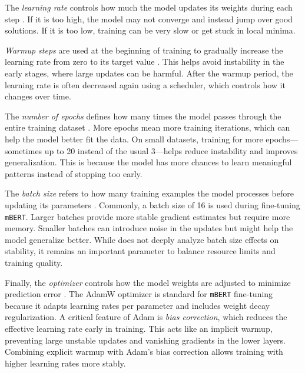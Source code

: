     The \textit{learning rate} controls how much the model updates its weights during each step \parencite{mosbachStabilityFinetuningBERT2021}. If it is too high, the model may not converge and instead jump over good solutions. If it is too low, training can be very slow or get stuck in local minima.

    \textit{Warmup steps} are used at the beginning of training to gradually increase the learning rate from zero to its target value \parencite{mosbachStabilityFinetuningBERT2021}. This helps avoid instability in the early stages, where large updates can be harmful. After the warmup period, the learning rate is often decreased again using a scheduler, which controls how it changes over time.

    The \textit{number of epochs} defines how many times the model passes through the entire training dataset \parencite{mosbachStabilityFinetuningBERT2021}. More epochs mean more training iterations, which can help the model better fit the data. On small datasets, training for more epochs—sometimes up to 20 instead of the usual 3—helps reduce instability and improves generalization. This is because the model has more chances to learn meaningful patterns instead of stopping too early.

    The \textit{batch size} refers to how many training examples the model processes before updating its parameters \parencite{mosbachStabilityFinetuningBERT2021}. Commonly, a batch size of 16 is used during fine-tuning \texttt{mBERT}. Larger batches provide more stable gradient estimates but require more memory. Smaller batches can introduce noise in the updates but might help the model generalize better. While \textcite{mosbachStabilityFinetuningBERT2021} does not deeply analyze batch size effects on stability, it remains an important parameter to balance resource limits and training quality.

    Finally, the \textit{optimizer} controls how the model weights are adjusted to minimize prediction error \parencite{mosbachStabilityFinetuningBERT2021}. The AdamW optimizer is standard for \texttt{mBERT} fine-tuning because it adapts learning rates per parameter and includes weight decay regularization. A critical feature of Adam is \textit{bias correction}, which reduces the effective learning rate early in training. This acts like an implicit warmup, preventing large unstable updates and vanishing gradients in the lower layers. Combining explicit warmup with Adam’s bias correction allows training with higher learning rates more stably.

